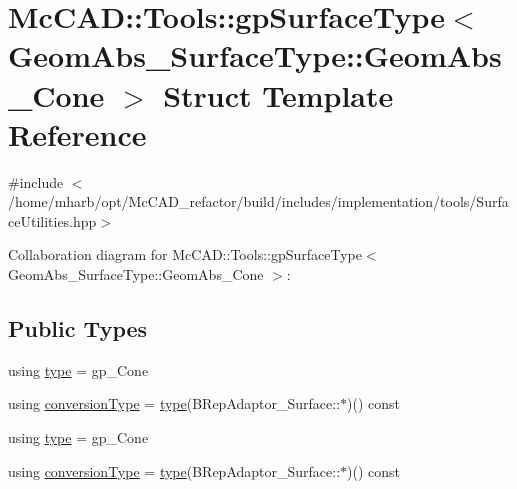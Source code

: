 \hypertarget{structMcCAD_1_1Tools_1_1gpSurfaceType_3_01GeomAbs__SurfaceType_1_1GeomAbs__Cone_01_4}{}\section{Mc\+C\+AD\+:\+:Tools\+:\+:gp\+Surface\+Type$<$ Geom\+Abs\+\_\+\+Surface\+Type\+:\+:Geom\+Abs\+\_\+\+Cone $>$ Struct Template Reference}
\label{structMcCAD_1_1Tools_1_1gpSurfaceType_3_01GeomAbs__SurfaceType_1_1GeomAbs__Cone_01_4}


{\ttfamily \#include $<$/home/mharb/opt/\+Mc\+C\+A\+D\+\_\+refactor/build/includes/implementation/tools/\+Surface\+Utilities.\+hpp$>$}



Collaboration diagram for Mc\+C\+AD\+:\+:Tools\+:\+:gp\+Surface\+Type$<$ Geom\+Abs\+\_\+\+Surface\+Type\+:\+:Geom\+Abs\+\_\+\+Cone $>$\+:
\subsection*{Public Types}
\begin{DoxyCompactItemize}
\item 
using \hyperlink{structMcCAD_1_1Tools_1_1gpSurfaceType_3_01GeomAbs__SurfaceType_1_1GeomAbs__Cone_01_4_a45a7bfeee0dd094ad2d703572b0cff94}{type} = gp\+\_\+\+Cone
\item 
using \hyperlink{structMcCAD_1_1Tools_1_1gpSurfaceType_3_01GeomAbs__SurfaceType_1_1GeomAbs__Cone_01_4_ac8a1ab6a2261261ea3b9d10002f0f89d}{conversion\+Type} = \hyperlink{structMcCAD_1_1Tools_1_1gpSurfaceType_3_01GeomAbs__SurfaceType_1_1GeomAbs__Cone_01_4_a45a7bfeee0dd094ad2d703572b0cff94}{type}(B\+Rep\+Adaptor\+\_\+\+Surface\+::$\ast$)() const
\item 
using \hyperlink{structMcCAD_1_1Tools_1_1gpSurfaceType_3_01GeomAbs__SurfaceType_1_1GeomAbs__Cone_01_4_a45a7bfeee0dd094ad2d703572b0cff94}{type} = gp\+\_\+\+Cone
\item 
using \hyperlink{structMcCAD_1_1Tools_1_1gpSurfaceType_3_01GeomAbs__SurfaceType_1_1GeomAbs__Cone_01_4_ac8a1ab6a2261261ea3b9d10002f0f89d}{conversion\+Type} = \hyperlink{structMcCAD_1_1Tools_1_1gpSurfaceType_3_01GeomAbs__SurfaceType_1_1GeomAbs__Cone_01_4_a45a7bfeee0dd094ad2d703572b0cff94}{type}(B\+Rep\+Adaptor\+\_\+\+Surface\+::$\ast$)() const
\end{DoxyCompactItemize}
